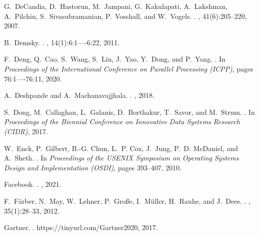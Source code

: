 \documentclass[11pt,dvipdfmx]{article}
\begin{document}
\begin{thebibliography}{10}
\begin{small}
  G.~DeCandia, D.~Hastorun, M.~Jampani, G.~Kakulapati, A.~Lakshman, A.~Pilchin,
    S.~Sivasubramanian, P.~Vosshall, and W.~Vogels.
  .
  , 41(6):205--220, 2007.
  
  B.~Demsky.
  .
  ,
    14(1):6:1----6:22, 2011.
  
  F.~Deng, Q.~Cao, S.~Wang, S.~Liu, J.~Yao, Y.~Dong, and P.~Yang.
  .
  \newblock In {\em Proceedings of the International Conference on Parallel
    Processing (ICPP)}, pages 76:1----76:11, 2020.
  
  A.~Deshpande and A.~Machanavajjhala.
  .
  , 2018.
  
  S.~Dong, M.~Callaghan, L.~Galanis, D.~Borthakur, T.~Savor, and M.~Strum.
  .
  \newblock In {\em Proceedings of the Biennial Conference on Innovative Data
    Systems Research (CIDR)}, 2017.
  
  W.~Enck, P.~Gilbert, B.-G. Chun, L.~P. Cox, J.~Jung, P.~D. McDaniel, and
    A.~Sheth.
  .
  \newblock In {\em Proceedings of the USENIX Symposium on Operating Systems
    Design and Implementation (OSDI)}, pages 393--407, 2010.
  
  Facebook.
  .
  , 2021.
  
  F.~F{\"{a}}rber, N.~May, W.~Lehner, P.~Gro{\ss}e, I.~M{\"{u}}ller, H.~Rauhe,
    and J.~Dees.
  .
  , 35(1):28--33, 2012.
  
  Gartner.
  .
  \newblock https://tinyurl.com/Gartner2020, 2017.
  

\end{small}
\end{thebibliography}
\end{document}
